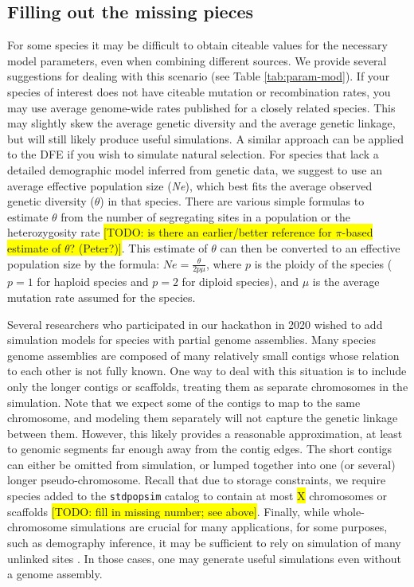 \documentclass[hidelinks]{article}
\newcommand{\stdpopsim}{\texttt{stdpopsim}\xspace}
\begin{document}
\subsection*{Filling out the missing pieces}

For some species it may be difficult to obtain citeable values for the necessary model parameters, even when combining different sources. We provide several suggestions for dealing with this scenario (see Table \ref{tab:param-mod}).
If your species of interest does not have citeable mutation or recombination rates, you may use average genome-wide rates published for a closely related species. This may slightly skew the average genetic diversity and the average genetic linkage, but will still likely produce useful simulations. A similar approach can be applied to the DFE if you wish to simulate natural selection.
For species that lack a detailed demographic model inferred from genetic data, we suggest to use an average effective population size (\emph{Ne}), which best fits the average observed genetic diversity ($\theta$) in that species. There are various simple formulas to estimate $\theta$ from the number of segregating sites in a population \citep{Watterson1975} or the heterozygosity rate \citep{Tajima1989} \colorbox{yellow}{[TODO: is there an earlier/better reference for $\pi$-based estimate of $\theta$? (Peter?)]}. This estimate of $\theta$ can then be converted to an effective population size by the formula: $Ne=\frac {\theta} {2p\mu}$, where $p$ is the ploidy of the species ($p=1$ for haploid species and $p=2$ for diploid species), and $\mu$ is the average mutation rate assumed for the species.

Several researchers who participated in our hackathon in 2020 wished to add simulation models for species with partial genome assemblies. Many species genome assemblies
are composed of many relatively small contigs whose relation to each
other is not fully known. One way to deal with this situation is to include only the  longer contigs or scaffolds, treating them as separate chromosomes in the simulation. Note that we expect some of the contigs to map to the same chromosome, and modeling them separately will not capture the genetic linkage between them. However, this likely provides a reasonable approximation, at least to genomic segments far enough away from the contig edges. The short contigs can either be omitted from simulation, or lumped together into one (or several) longer pseudo-chromosome. Recall that due to storage constraints, we require species added to the \stdpopsim catalog to contain at most \colorbox{yellow}{X} chromosomes or scaffolds \colorbox{yellow}{[TODO: fill in missing number; see above]}. Finally, while whole-chromosome simulations are crucial for many applications, for some purposes, such as demography inference, it may be sufficient to rely on simulation  of many unlinked sites \citep{Gutenkunst2009,Excoffier2013}. In those cases, one may generate useful simulations even without a genome assembly.
\end{document}
